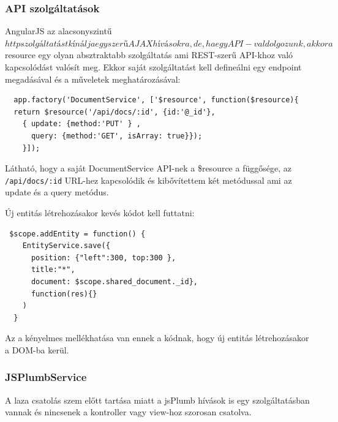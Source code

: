 \subsubsection{API szolgáltatások}

AngularJS az alacsonyszintű $http szolgáltatást kínálja egyszerű AJAX hívásokra, de, ha egy API-val dolgozunk, akkor a $resource egy olyan absztraktabb szolgáltatás ami REST-szerű API-khoz való kapcsolódást valósít meg. Ekkor saját szolgáltatást kell defineálni egy endpoint megadásával és a műveletek meghatározásával:






\begin{lstlisting}
  app.factory('DocumentService', ['$resource', function($resource){
  return $resource('/api/docs/:id', {id:'@_id'}, 
    { update: {method:'PUT' } , 
      query: {method:'GET', isArray: true}});
    }]);
\end{lstlisting}




Látható, hogy a saját DocumentService API-nek a \$resource a függősége, az \lstinline{/api/docs/:id} URL-hez kapcsolódik és kibővítettem két metódussal ami az update és a query metódus. 





Új entitás létrehozásakor kevés kódot kell futtatni:
\begin{lstlisting}
 $scope.addEntity = function() {
    EntityService.save({ 
      position: {"left":300, top:300 },
      title:"*", 
      document: $scope.shared_document._id}, 
      function(res){}
    )
  }
\end{lstlisting}

Az a kényelmes mellékhatása van ennek a kódnak, hogy új entitás létrehozásakor a DOM-ba kerül.

\subsubsection{JSPlumbService}











A laza csatolás szem előtt tartása miatt a jsPlumb hívások is egy szolgáltatásban vannak és nincsenek a kontroller vagy view-hoz szorosan csatolva. 

